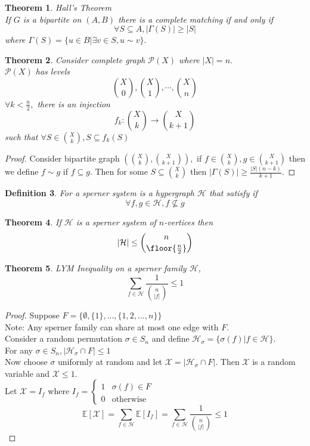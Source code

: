 \documentclass[a4paper]{article}
\newtheorem{thm}{Theorem}[section]
\newtheorem{defn}[thm]{Definition}
\begin{document}
\begin{thm}
    Hall's Theorem\\ If $G$ is a bipartite on $(A, B)$ there is a complete matching if and only if$$\forall S\subseteq A,|\Gamma(S)|\geq |S|$$ where $\Gamma(S)=\{u\in B|\exists v\in S, u \sim v\}.$
\end{thm}
\begin{thm}
    Consider complete graph $\mathcal{P}(X)$ where $|X|=n.$ \\$\mathcal{P}(X)$ has levels $${X \choose 0}, {X \choose 1},\cdots, {X \choose n}$$
    $\forall k<\frac{n}{2},$ there is an injection $$f_k:{X \choose k}\to {X \choose k+1}$$ such that $\forall S\in {X \choose k}, S\subseteq f_k(S)$
\end{thm}
\begin{proof}
    Consider bipartite graph $\left ({X \choose k}, {X \choose k+1} \right ),$ if $f\in {X \choose k}, g\in {X \choose k+1}$ then we define $f\sim g$ if $f\subseteq g.$ Then for some $S\subseteq {X \choose k}$ then $|\Gamma(S)|\geq \frac{|S|(n-k)}{k+1}.$ 
\end{proof}
\begin{defn}
    For a sperner system is a hypergraph $\mathcal{H}$ that satisfy if $$\forall f,g\in \mathcal{H}, f\not \subseteq g$$
\end{defn}
\begin{thm}
    If $\mathcal{H}$ is a sperner system of $n$-vertices then $$|\mathcal{H}|\leq {n \choose \floor{\frac{n}{2}}}$$
\end{thm}
\begin{thm}
    LYM Inequality on a sperner family $\mathcal{H}$, $$\sum_{f\in \mathcal{H}}\frac{1}{{n \choose |f|}}\leq 1$$
\end{thm}
\begin{proof}
    Suppose $F=\{\emptyset, \{1\},...,\{1,2,...,n\}\}$\\
    Note: Any sperner family can share at most one edge with $F.$\\
    Consider a random permutation $\sigma\in S_n$ and define $\mathcal{H}_\sigma=\{\sigma(f)|f\in \mathcal{H}\}.$\\
    For any $\sigma\in S_n, |\mathcal{H}_\sigma\cap F|\leq 1$\\
    Now choose $\sigma$ uniformly at random and let $\mathcal{X}=|\mathcal{H}_\sigma\cap F|$. Then $\mathcal{X}$ is a random variable and $\mathcal{X}\leq 1.$\\
    Let $\mathcal{X}=I_f$ where $I_f=\begin{cases}
        1 & \sigma(f)\in F \\ 0 &\text{otherwise}
    \end{cases}$
    $$\mathbb{E}[\mathcal{X}]=\sum_{f\in \mathcal{H}}\mathbb{E}[I_f]=\sum_{f\in \mathcal{H}}\frac{1}{{n \choose |f|}}\leq 1$$
\end{proof}
\end{document}
